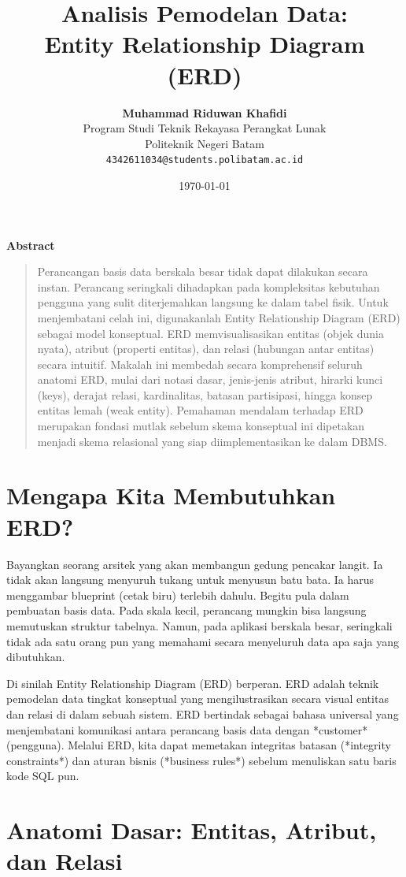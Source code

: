 \documentclass[11pt,a4paper]{article}
\title{\vspace{-1.5cm}\textbf{\sffamily\LARGE Analisis Pemodelan Data: \\ Entity Relationship Diagram (ERD)}}
\author{
	\textbf{Muhammad Riduwan Khafidi} \\
	\small Program Studi Teknik Rekayasa Perangkat Lunak \\
	\small Politeknik Negeri Batam \\
	\small \texttt{4342611034@students.polibatam.ac.id}
}
\date{\small\today}
\renewenvironment{abstract}
{\small
	\begin{center}\textbf{\sffamily Abstract}\end{center}
	\begin{quote}}
	{\end{quote}}
\begin{document}
\maketitle
\thispagestyle{empty}

\begin{abstract}
	Perancangan basis data berskala besar tidak dapat dilakukan secara instan. Perancang seringkali dihadapkan pada kompleksitas kebutuhan pengguna yang sulit diterjemahkan langsung ke dalam tabel fisik. Untuk menjembatani celah ini, digunakanlah Entity Relationship Diagram (ERD) sebagai model konseptual. ERD memvisualisasikan entitas (objek dunia nyata), atribut (properti entitas), dan relasi (hubungan antar entitas) secara intuitif. Makalah ini membedah secara komprehensif seluruh anatomi ERD, mulai dari notasi dasar, jenis-jenis atribut, hirarki kunci (keys), derajat relasi, kardinalitas, batasan partisipasi, hingga konsep entitas lemah (weak entity). Pemahaman mendalam terhadap ERD merupakan fondasi mutlak sebelum skema konseptual ini dipetakan menjadi skema relasional yang siap diimplementasikan ke dalam DBMS.
\end{abstract}

\section{Mengapa Kita Membutuhkan ERD?}

Bayangkan seorang arsitek yang akan membangun gedung pencakar langit. Ia tidak akan langsung menyuruh tukang untuk menyusun batu bata. Ia harus menggambar blueprint (cetak biru) terlebih dahulu. Begitu pula dalam pembuatan basis data. Pada skala kecil, perancang mungkin bisa langsung memutuskan struktur tabelnya. Namun, pada aplikasi berskala besar, seringkali tidak ada satu orang pun yang memahami secara menyeluruh data apa saja yang dibutuhkan.

Di sinilah Entity Relationship Diagram (ERD) berperan. ERD adalah teknik pemodelan data tingkat konseptual yang mengilustrasikan secara visual entitas dan relasi di dalam sebuah sistem. ERD bertindak sebagai bahasa universal yang menjembatani komunikasi antara perancang basis data dengan *customer* (pengguna). Melalui ERD, kita dapat memetakan integritas batasan (*integrity constraints*) dan aturan bisnis (*business rules*) sebelum menuliskan satu baris kode SQL pun.

\section{Anatomi Dasar: Entitas, Atribut, dan Relasi}
\end{document}
